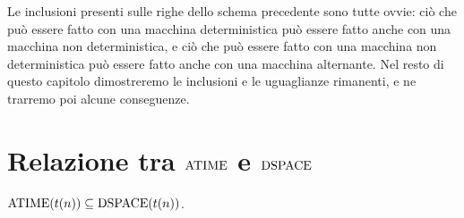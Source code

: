 Le inclusioni presenti sulle righe dello schema precedente sono tutte ovvie: ciò che può essere fatto con una macchina deterministica può essere fatto anche con una macchina non deterministica, e ciò che può essere fatto con una macchina non deterministica può essere fatto anche con una macchina alternante.
Nel resto di questo capitolo dimostreremo le inclusioni e le uguaglianze rimanenti, e ne trarremo poi alcune conseguenze.


\section{Relazione tra \texorpdfstring{$\operatorname{ATIME}$}{ATIME} e \texorpdfstring{$\operatorname{DSPACE}$}{DSPACE}}

\begin{teorema}
  \label{thm:atime-dspace}
  $\operatorname{ATIME}(t(n)) \subseteq \operatorname{DSPACE}(t(n))$.
\end{teorema}


